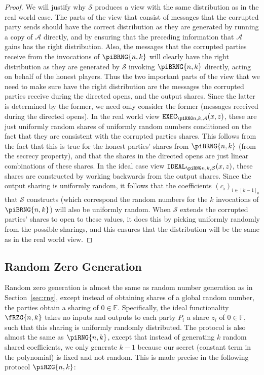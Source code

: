 \documentclass{article}
\newcommand{\seqZ}[1]{\left[#1\right]_0}
\theoremstyle{remark}
\newcommand{\F}{\mathbb{F}}
\begin{document}
\begin{proof}
	We will justify why $\mathcal{S}$ produces a view with the same
	distribution as in the real world case. The parts of the view that consist
	of messages that the corrupted party sends should have the correct
	distribution as they are generated by running a copy of $\mathcal{A}$
	directly, and by ensuring that the preceding information that $\mathcal{A}$
	gains has the right distribution. Also, the messages that the corrupted
	parties receive from the invocations of $\piBRNG{n,k}$ will clearly have
	the right distribution as they are generated by $\mathcal{S}$ invoking
	$\piBRNG{n,k}$ directly, acting on behalf of the honest players. Thus the
	two important parts of the view that we need to make sure have the right
	distribution are the messages the corrupted parties receive during the
	directed opens, and the output shares. Since the latter is determined by
	the former, we need only consider the former (messages received during the
	directed opens). In the real world view $\execD$, these are just uniformly
	random shares of uniformly random numbers conditioned on the fact that they
	are consistent with the corrupted parties shares. This follows from the
	fact that this is true for the honest parties' shares from $\piBRNG{n,k}$
	(from the secrecy property), and that the shares in the directed opens are
	just linear combinations of these shares. In the ideal case view $\idealD$,
	these shares are constructed by working backwards from the output shares.
	Since the output sharing is uniformly random, it follows that the
	coefficients ${(c_i)}_{i \in \seqZ{k-1}}$ that $\mathcal{S}$ constructs
	(which correspond the random numbers for the $k$ invocations of
	$\piBRNG{n,k}$) will also be uniformly random. When $\mathcal{S}$ extends
	the corrupted parties' shares to open to these values, it does this by
	picking uniformly randomly from the possible sharings, and this ensures
	that the distribution will be the same as in the real world view.
\end{proof}

\subsection{Random Zero Generation}\label{sec:rzg}

Random zero generation is almost the same as random number generation as in
Section~\ref{sec:rng}, except instead of obtaining shares of a global random
number, the parties obtain a sharing of $0 \in \F$. Specifically, the ideal
functionality $\fRZG{n,k}$ takes no inputs and outputs to each party $P_i$ a
share $z_i$ of $0 \in \F$, such that this sharing is uniformly randomly
distributed. The protocol is also almost the same as $\piRNG{n,k}$, except that
instead of generating $k$ random shared coefficients, we only generate $k-1$
because our secret (constant term in the polynomial) is fixed and not random.
This is made precise in the following protocol $\piRZG{n,k}$:
\end{document}
